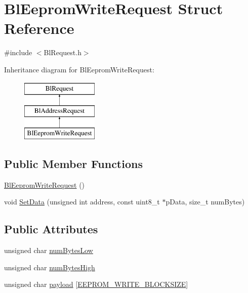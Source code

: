 \hypertarget{struct_bl_eeprom_write_request}{\section{Bl\-Eeprom\-Write\-Request Struct Reference}
\label{struct_bl_eeprom_write_request}
}


{\ttfamily \#include $<$Bl\-Request.\-h$>$}

Inheritance diagram for Bl\-Eeprom\-Write\-Request\-:\begin{figure}[H]
\begin{center}
\leavevmode
\includegraphics[height=3.000000cm]{struct_bl_eeprom_write_request}
\end{center}
\end{figure}
\subsection*{Public Member Functions}
\begin{DoxyCompactItemize}
\item 
\hyperlink{struct_bl_eeprom_write_request_a3b99db2cb245648831ca9c4d7f0f2850}{Bl\-Eeprom\-Write\-Request} ()
\item 
void \hyperlink{struct_bl_eeprom_write_request_a1855ba1e441ab8188e8384e64ebb0d59}{Set\-Data} (unsigned int address, const uint8\-\_\-t $\ast$p\-Data, size\-\_\-t num\-Bytes)
\end{DoxyCompactItemize}
\subsection*{Public Attributes}
\begin{DoxyCompactItemize}
\item 
unsigned char \hyperlink{struct_bl_eeprom_write_request_a99a5d20f83d1fac437f3f54703d40e14}{num\-Bytes\-Low}
\item 
unsigned char \hyperlink{struct_bl_eeprom_write_request_ab048ccd01058cf6713bd40b7120f9584}{num\-Bytes\-High}
\item 
unsigned char \hyperlink{struct_bl_eeprom_write_request_a55b1312edf28cfa81d1ca266c986ad72}{payload} \mbox{[}\hyperlink{_bl_request_8h_a5f45dd63fc17090ece1b40b668195185}{E\-E\-P\-R\-O\-M\-\_\-\-W\-R\-I\-T\-E\-\_\-\-B\-L\-O\-C\-K\-S\-I\-Z\-E}\mbox{]}
\end{DoxyCompactItemize}


